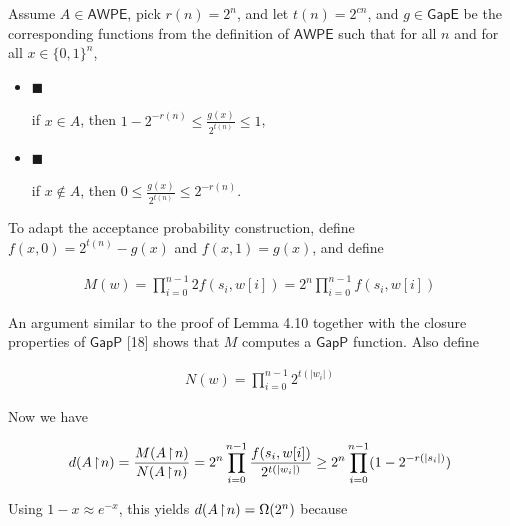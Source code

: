 \documentclass[10pt,a4paper]{article}
\begin{document}
Assume $A\in\mathsf{AWPE}$, pick $r(n)=2^{n}$, and let $t(n)=2^{cn}$, and $g\in\mathsf{GapE}$ be the corresponding functions from the definition of $\mathsf{AWPE}$ such that for all $n$ and for all $x\in\{0,1\}^{n}$,\par


\begin{itemize}


\item[] 
$\blacksquare$ 


if $x\in A$, then $1-2^{-r(n)}\leq\frac{g(x)}{2^{t(n)}}\leq 1$,\par





\item[] 
$\blacksquare$ 


if $x\notin A$, then $0\leq\frac{g(x)}{2^{t(n)}}\leq 2^{-r(n)}$.\par





\end{itemize}


To adapt the acceptance probability construction, define $f(x,0)=2^{t(n)}-g(x)$ and $f(x,1)=g(x)$, and define\par


\[\begin{gathered}
M(w)=\prod_{i=0}^{n-1}2f(s_{i},w[i])=2^{n}\prod_{i=0}^{n-1}f(s_{i},w[i])
\end{gathered}\]


An argument similar to the proof of Lemma 4.10 together with the closure properties of $\mathsf{GapP}$ [18] shows that $M$ computes a $\mathsf{GapP}$ function.
Also define\par


\[\begin{gathered}
N(w)=\prod_{i=0}^{n-1}2^{t(|w_{i}|)}
\end{gathered}\]


Now we have\par


\[\begin{gathered}
d(A\negthinspace\upharpoonright\negthinspace n)=\frac{M(A\negthinspace\upharpoonright\negthinspace n)}{N(A\negthinspace\upharpoonright\negthinspace n)}=2^{n}\prod_{i=0}^{n-1}\frac{f(s_{i},w[i])}{2^{t(|w_{i}|)}}\geq 2^{n}\prod_{i=0}^{n-1}(1-2^{-r(|s_{i}|)})
\end{gathered}\]


Using $1-x\approx e^{-x}$, this yields $d(A\negthinspace\upharpoonright\negthinspace n)=\Omega(2^{n})$ because\par
\end{document}

